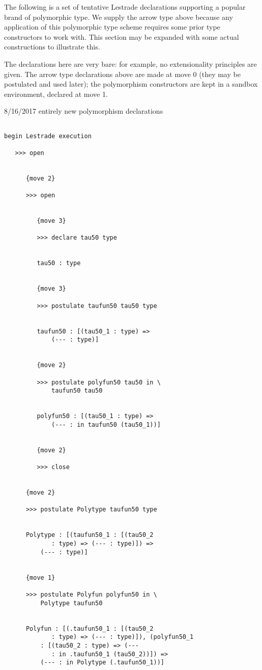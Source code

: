 \documentclass[12pt]{article}
\begin{document}
The following is a set of tentative Lestrade declarations supporting a popular brand of polymorphic type.  We supply the arrow type above
because any application of this polymorphic type scheme requires some prior type constructors to work with.  This section may be expanded with some actual constructions to illustrate this.

The declarations here are very bare:  for example, no extensionality principles are given.  The arrow type declarations above are made at move 0
(they may be postulated and used later);  the polymorphism constructors are kept in a sandbox environment, declared at move 1.

8/16/2017 entirely new polymorphism declarations

\begin{verbatim}

begin Lestrade execution

   >>> open


      {move 2}

      >>> open


         {move 3}

         >>> declare tau50 type


         tau50 : type


         {move 3}

         >>> postulate taufun50 tau50 type


         taufun50 : [(tau50_1 : type) => 
             (--- : type)]


         {move 2}

         >>> postulate polyfun50 tau50 in \
             taufun50 tau50


         polyfun50 : [(tau50_1 : type) => 
             (--- : in taufun50 (tau50_1))]


         {move 2}

         >>> close


      {move 2}

      >>> postulate Polytype taufun50 type


      Polytype : [(taufun50_1 : [(tau50_2 
             : type) => (--- : type)]) => 
          (--- : type)]


      {move 1}

      >>> postulate Polyfun polyfun50 in \
          Polytype taufun50


      Polyfun : [(.taufun50_1 : [(tau50_2 
             : type) => (--- : type)]), (polyfun50_1 
          : [(tau50_2 : type) => (--- 
             : in .taufun50_1 (tau50_2))]) => 
          (--- : in Polytype (.taufun50_1))]



\end{verbatim}
\end{document}
